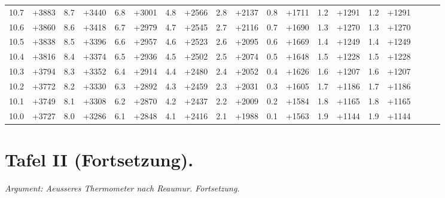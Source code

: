 \documentclass[10pt,a4paper]{article}
\begin{document}
\begin{center}
\begin{longtable}{@{}r|rrr|rrr|rrr|rrr|rrr|rrr@{}}
10.7 & +3883 & 8.7 & +3440 & 6.8 & +3001 & 4.8 & +2566 & 2.8 & +2137 & 0.8 & +1711 & 1.2 & +1291 & 1.2 & +1291 \\
10.6 & +3860 & 8.6 & +3418 & 6.7 & +2979 & 4.7 & +2545 & 2.7 & +2116 & 0.7 & +1690 & 1.3 & +1270 & 1.3 & +1270 \\
10.5 & +3838 & 8.5 & +3396 & 6.6 & +2957 & 4.6 & +2523 & 2.6 & +2095 & 0.6 & +1669 & 1.4 & +1249 & 1.4 & +1249 \\
10.4 & +3816 & 8.4 & +3374 & 6.5 & +2936 & 4.5 & +2502 & 2.5 & +2074 & 0.5 & +1648 & 1.5 & +1228 & 1.5 & +1228 \\
10.3 & +3794 & 8.3 & +3352 & 6.4 & +2914 & 4.4 & +2480 & 2.4 & +2052 & 0.4 & +1626 & 1.6 & +1207 & 1.6 & +1207 \\
10.2 & +3772 & 8.2 & +3330 & 6.3 & +2892 & 4.3 & +2459 & 2.3 & +2031 & 0.3 & +1605 & 1.7 & +1186 & 1.7 & +1186 \\
10.1 & +3749 & 8.1 & +3308 & 6.2 & +2870 & 4.2 & +2437 & 2.2 & +2009 & 0.2 & +1584 & 1.8 & +1165 & 1.8 & +1165 \\
10.0 & +3727 & 8.0 & +3286 & 6.1 & +2848 & 4.1 & +2416 & 2.1 & +1988 & 0.1 & +1563 & 1.9 & +1144 & 1.9 & +1144 \\
\end{longtable}
\end{center}

\clearpage
\section*{Tafel II (Fortsetzung).}

\begin{center}
\small
\textit{Argument: Aeusseres Thermometer nach Reaumur. Fortsetzung.}
\end{center}
\end{document}
